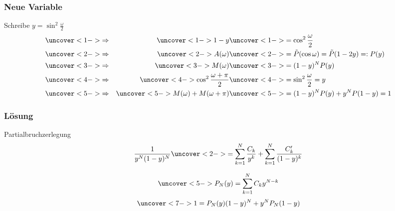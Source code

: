 %
%
\begin{frame}
\frametitle{Neue Variable}
\begin{block}{Schreibe $y=\sin^2\frac{\omega}2$}
\vspace{-20pt}
\begin{align}
&\uncover<1->{\Rightarrow}&
\uncover<1->{1-y}&\uncover<1->{= \cos^2\frac{\omega}2}
\notag
\\
&\uncover<2->{\Rightarrow}&
\uncover<2->{A(\omega)}&\uncover<2->{=\tilde{P}(\cos\omega)=\tilde{P}(1-2y)=:P(y)}
\notag
\\
&\uncover<3->{\Rightarrow}&
\uncover<3->{M(\omega)}&\uncover<3->{=(1-y)^N P(y)}
\notag
\\
&\uncover<4->{\Rightarrow}&
\uncover<4->{\cos^2\frac{\omega+\pi}2}&\uncover<4->{=\sin^2\frac{\omega}2=y}
\notag
\\
&\uncover<5->{\Rightarrow}&
\uncover<5->{M(\omega)+M(\omega+\pi)}&\uncover<5->{= (1-y)^N P(y) + y^N P(1-y) = 1}
\label{algcond}
\end{align}
\end{block}
\end{frame}

%
%
%
\begin{frame}
\frametitle{Lösung}
\begin{block}{Partialbruchzerlegung}
\[
\frac{1}{y^N(1-y)^N}
\uncover<2->{=
\sum_{k=1}^N \frac{\mathstrut C_k}{\mathstrut y^k}
+
\sum_{k=1}^N \frac{\mathstrut C_k'}{\mathstrut (1-y)^k}
}
\]
\end{block}
\[
\uncover<5->{P_N(y) = \sum_{k=1}^N C_ky^{N-k}}
\]
\[
\uncover<7->{1=
P_N(y) (1-y)^N + y^N P_N(1-y)}
\]
\end{frame}

